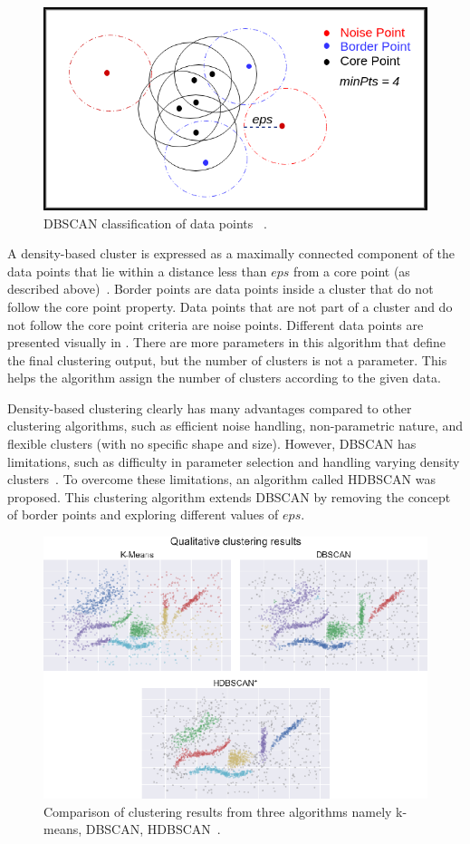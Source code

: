 \begin{description}
	
	\begin{figure}[h]
		\centering
		\includegraphics[width=.6\textwidth]{images/papers/dbscan.png}
		\caption{DBSCAN classification of data points ~\cite{knoldusDBSCANClustering}. \label{fig:dbscan}}
	\end{figure}
	
	A density-based cluster is expressed as a maximally connected component of the data points that lie within a distance less than $eps$ from a core point (as described above)~\cite{campello2020density}. Border points are data points inside a cluster that do not follow the core point property. Data points that are not part of a cluster and do not follow the core point criteria are noise points. Different data points are presented visually in . There are more parameters in this algorithm that define the final clustering output, but the number of clusters is not a parameter. This helps the algorithm assign the number of clusters according to the given data.

	
	Density-based clustering clearly has many advantages compared to other clustering algorithms, such as efficient noise handling, non-parametric nature, and flexible clusters (with no specific shape and size). However, \ac{DBSCAN} has limitations, such as difficulty in parameter selection and handling varying density clusters~\cite{mcinnes2017accelerated}. To overcome these limitations, an algorithm called \ac{HDBSCAN} was proposed. This clustering algorithm extends \ac{DBSCAN} by removing the concept of border points and exploring different values of $eps$. 
	
		\begin{figure}[h]
		\centering
		\includegraphics[width=.8\textwidth]{images/papers/hdbscan.png}
		\caption[K-means vs DBSCAN vs HDBSCAN clustering performance.]{Comparison of clustering results from three algorithms namely k-means, DBSCAN, HDBSCAN~\cite{mcinnes2017accelerated}.  \label{fig:hdbscan}}
	\end{figure}
	

\end{description}
